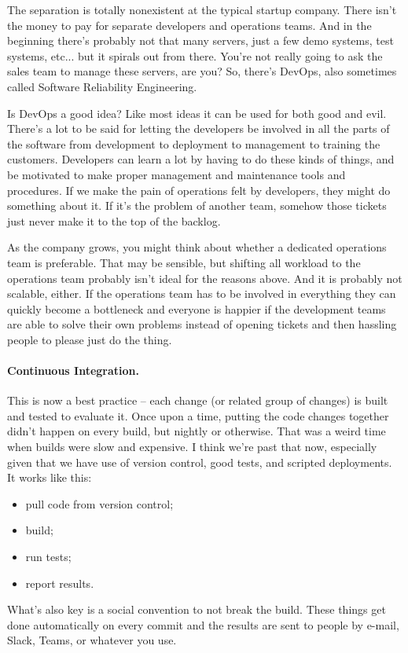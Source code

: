 The separation is totally nonexistent at the typical startup company. There isn't the money to pay for separate developers and operations teams. And in the beginning there's probably not that many servers, just a few demo systems, test systems, etc... but it spirals out from there. You're not really going to ask the sales team to manage these servers, are you? So, there's DevOps, also sometimes called Software Reliability Engineering.

Is DevOps a good idea? Like most ideas it can be used for both good and evil. There's a lot to be said for letting the developers be involved in all the parts of the software from development to deployment to management to training the customers. Developers can learn a lot by having to do these kinds of things, and be motivated to make proper management and maintenance tools and procedures. If we make the pain of operations felt by developers, they might do something about it. If it's the problem of another team, somehow those tickets just never make it to the top of the backlog.

As the company grows, you might think about whether a dedicated operations team is preferable. That may be sensible, but shifting all workload to the operations team probably isn't ideal for the reasons above. And it is probably not scalable, either. If the operations team has to be involved in everything they can quickly become a bottleneck and everyone is happier if the development teams are able to solve their own problems instead of opening tickets and then hassling people to please just do the thing.

\paragraph{Continuous Integration.} 
This is now a best practice -- each change (or related group of changes) is built and tested to evaluate it. Once upon a time, putting the code changes together didn't happen on every build, but nightly or otherwise. That was a weird time when builds were slow and expensive. I think we're past that now, especially given that we have use of version control, good tests, and scripted deployments.
It works like this:
\begin{itemize}
\item pull code from version control;
\item build;
\item run tests;
\item report results.
\end{itemize}
What's also key is a social convention to not break the build. These things get done automatically on every commit and the results are sent to people by e-mail, Slack, Teams, or whatever you use. 

